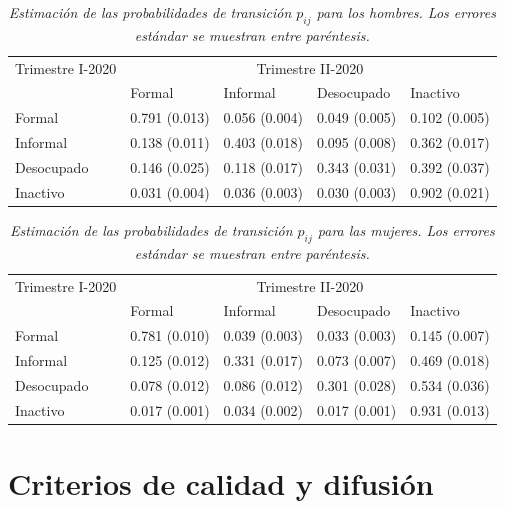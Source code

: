 \documentclass[
  10pt,
  spanish,
]{book}
\begin{document}
\begin{table}[!h]
\centering
\begin{tabular}{lllll}
Trimestre I-2020&\multicolumn{4}{c}{Trimestre II-2020}\\\cline{2-5}
                            & Formal            &Informal       &Desocupado         &Inactivo           \\\hline
Formal              & 0.791 (0.013)     & 0.056 (0.004)     & 0.049 (0.005)     & 0.102 (0.005)         \\
Informal            & 0.138 (0.011)     & 0.403 (0.018)     & 0.095 (0.008)     & 0.362 (0.017)                 \\
Desocupado            & 0.146 (0.025)   & 0.118 (0.017)     & 0.343 (0.031)     & 0.392 (0.037)         \\
Inactivo            & 0.031 (0.004)     & 0.036 (0.003)     & 0.030 (0.003)     & 0.902 (0.021)         \\\hline
\end{tabular}
\caption{\emph{Estimación de las probabilidades de transición $p_{ij}$ para los hombres. Los errores estándar se muestran entre paréntesis.}}
\label{t6a}
\end{table}

\begin{table}[!h]
\centering
\begin{tabular}{lllll}
Trimestre I-2020&\multicolumn{4}{c}{Trimestre II-2020}\\\cline{2-5}
                            & Formal            &Informal       &Desocupado         &Inactivo           \\\hline
Formal              & 0.781 (0.010)     & 0.039 (0.003)     & 0.033 (0.003)     & 0.145 (0.007)         \\
Informal            & 0.125 (0.012)     & 0.331 (0.017)     & 0.073 (0.007)     & 0.469 (0.018)                 \\
Desocupado            & 0.078 (0.012)   & 0.086 (0.012)     & 0.301 (0.028)     & 0.534 (0.036)         \\
Inactivo            & 0.017 (0.001)     & 0.034 (0.002)     & 0.017 (0.001)     & 0.931 (0.013)         \\\hline
\end{tabular}
\caption{\emph{Estimación de las probabilidades de transición $p_{ij}$ para las mujeres. Los errores estándar se muestran entre paréntesis.}}
\label{t6b}
\end{table}

\hypertarget{criterios-de-calidad-y-difusiuxf3n}{%
\chapter{Criterios de calidad y difusión}\label{criterios-de-calidad-y-difusiuxf3n}}
\end{document}
